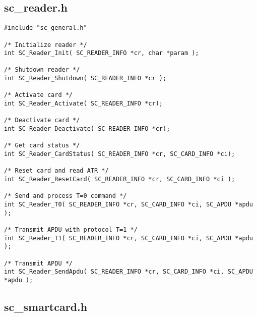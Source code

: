 \documentclass[a4paper,oneside]{article}
\begin{document}

\subsection{sc\_reader.h}

\begin{verbatim}
#include "sc_general.h"

/* Initialize reader */
int SC_Reader_Init( SC_READER_INFO *cr, char *param );

/* Shutdown reader */
int SC_Reader_Shutdown( SC_READER_INFO *cr );

/* Activate card */
int SC_Reader_Activate( SC_READER_INFO *cr);

/* Deactivate card */
int SC_Reader_Deactivate( SC_READER_INFO *cr);

/* Get card status */
int SC_Reader_CardStatus( SC_READER_INFO *cr, SC_CARD_INFO *ci);

/* Reset card and read ATR */
int SC_Reader_ResetCard( SC_READER_INFO *cr, SC_CARD_INFO *ci );

/* Send and process T=0 command */
int SC_Reader_T0( SC_READER_INFO *cr, SC_CARD_INFO *ci, SC_APDU *apdu );

/* Transmit APDU with protocol T=1 */
int SC_Reader_T1( SC_READER_INFO *cr, SC_CARD_INFO *ci, SC_APDU *apdu );

/* Transmit APDU */
int SC_Reader_SendApdu( SC_READER_INFO *cr, SC_CARD_INFO *ci, SC_APDU *apdu );
\end{verbatim}


\subsection{sc\_smartcard.h}
\end{document}

